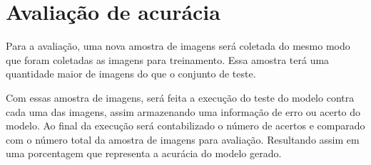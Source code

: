 \section{Avaliação de acurácia}

Para a avaliação, uma nova amostra de imagens será coletada do mesmo
modo que foram coletadas as imagens para treinamento. Essa amostra
terá uma quantidade maior de imagens do que o conjunto de teste.

Com essas amostra de imagens, será feita a execução do teste do modelo
contra cada uma das imagens, assim armazenando uma informação de erro
ou acerto do modelo. Ao final da execução será contabilizado o número
de acertos e comparado com o número total da amostra de imagens para
avaliação. Resultando assim em uma porcentagem que representa a
acurácia do modelo gerado.

